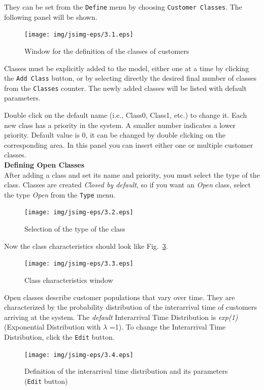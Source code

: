 They can be set from the \texttt{Define} menu by choosing
\texttt{Customer Classes}. The following panel will be shown.

\begin{figure}[htb]
    \begin{center}
        \texttt{[image: img/jsimg-eps/3.1.eps]}
    \end{center}
    \caption{Window for the definition of the classes of customers}
    \label{fig:jsimg:defclwin}
\end{figure}

Classes must be explicitly added to the model, either one at a
time by clicking the \texttt{Add Class} button, or by selecting
directly the desired final number of classes from the
\texttt{Classes} counter. The newly added classes will be listed
with default parameters.

Double click on the default name (i.e., Class0, Class1, etc.) to
change it. Each new class has a priority in the system. A smaller
number indicates a lower priority. Default value is 0, it can be
changed by double clicking on the corresponding area. In this
panel you can insert either one or multiple
customer classes.\\

\textbf{Defining Open Classes}\\
After adding a class and set its name and priority, you must
select the type of the class. Classes are created \emph{Closed by
default}, so if you want an \emph{Open} class, select the type
\emph{Open} from the \texttt{Type} menu.
\begin{figure}[htb]
    \begin{center}
        \texttt{[image: img/jsimg-eps/3.2.eps]}
    \end{center}
    \caption{Selection of the type of the class}
    \label{fig:typeclass}
\end{figure}

Now the class characteristics should look like Fig.~\ref{fig:classchar}.

\begin{figure}[htb]
    \begin{center}
        \texttt{[image: img/jsimg-eps/3.3.eps]}
    \end{center}
    \caption{Class characteristics window}
    \label{fig:classchar}
\end{figure}

Open classes describe customer populations that vary over time.
They are characterized by the probability distribution of the
interarrival time of customers arriving at the system. The
\emph{default} Interarrival Time Distribution is \emph{exp(1)}
(Exponential Distribution with $\lambda$ =1). To change the
Interarrival Time Distribution, click the \texttt{Edit} button.
\begin{figure}[htb]
    \begin{center}
        \texttt{[image: img/jsimg-eps/3.4.eps]}
    \end{center}
    \caption{Definition of the interarrival time distribution and its parameters (\texttt{Edit} button)}
    \label{fig:defclasschar}
\end{figure}

